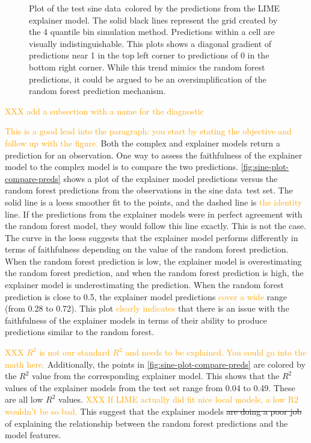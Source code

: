 \documentclass[AMS,STIX2COL]{WileyNJD-v2}\usepackage[]{graphicx}\usepackage[]{color}
\newenvironment{knitrout}{}{} %
\newcommand{\hh}[1]{\textcolor{orange}{#1}}
\newcommand{\data}{sine data}
\begin{document}
{\begin{figure}[!t]
\begin{knitrout}
\end{knitrout}
\caption{Plot of the test \data \ colored by the predictions from the LIME explainer model. The solid black lines represent the grid created by the 4 quantile bin simulation method. Predictions within a cell are visually indistinguishable. This plots shows a diagonal gradient of predictions near 1 in the top left corner to predictions of 0 in the bottom right corner. While this trend mimics the random forest predictions, it could be argued to be an oversimplification of the random forest prediction mechanism.}
\label{fig:sine-plot-grid}
\end{figure}

\hh{XXX add a subsection with a name for the diagnostic}

\hh{This is a good lead into the paragraph: you start by stating the objective and follow up with the figure.}
Both the complex and explainer models return a prediction for an observation. One way to assess the faithfulness of the explainer model to the complex model is to compare the two predictions. \autoref{fig:sine-plot-compare-preds} shows a plot of the explainer model predictions versus the random forest predictions from the observations in the \data \ test set. The solid line is a loess smoother fit to the points, and the dashed line is \hh{the identity} line. If the predictions from the explainer models were in perfect agreement with the random forest model, they would follow this line exactly. This is not the case. The curve in the loess suggests that the explainer model performs differently in terms of faithfulness depending on the value of the random forest prediction. When the random forest prediction is low, the explainer model is overestimating the random forest prediction, and when the random forest prediction is high, the explainer model is underestimating the prediction. When the random forest prediction is close to 0.5, the explainer model predictions \hh{cover a wide} range (from 0.28 to 0.72). This plot \hh{clearly indicates} that there is an issue with the faithfulness of the explainer models in terms of their ability to produce predictions similar to the random forest.

\hh{XXX $R^2$ is not our standard $R^2$ and needs to be explained. You could go into the math here.}
Additionally, the points in \autoref{fig:sine-plot-compare-preds} are colored by the $R^2$ value from the corresponding explainer model. This shows that the $R^2$ values of the explainer models from the test set range from 0.04 to 0.49. These are all low $R^2$ values.  \hh{XXX If LIME actually did fit nice local models, a low R2 wouldn't be so bad.} This suggest that the explainer models \sout{are doing a poor job} of explaining the relationship between the random forest predictions and the model features.

}
\end{document}
